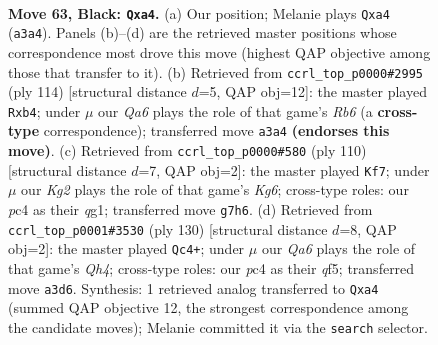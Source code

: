 \documentclass[11pt]{article}
\begin{document}
\clearpage

\begin{figure}[p]\centering
\begin{subfigure}{0.46\textwidth}\centering
\resizebox{\linewidth}{!}{%
\newchessgame
\chessboard[
  setfen={8/p5k1/1p6/8/P1P5/q7/4K3/8 b - - 0 63},
  showmover=false,
  pgfstyle=straightmove, color=movearrow, markmove={a3-a4}
]}
\caption{}
\end{subfigure}\hfill
\begin{subfigure}{0.46\textwidth}\centering
\resizebox{\linewidth}{!}{%
\newchessgame
\chessboard[
  setfen={8/6k1/1R6/8/1p1K4/1P6/P4p2/8 w - - 0 58},
  showmover=false,
  pgfstyle=straightmove, color=movearrow, markmove={b6-b4}
]}
\caption{}
\end{subfigure}
\\[4pt]
\begin{subfigure}{0.46\textwidth}\centering
\resizebox{\linewidth}{!}{%
\newchessgame
\chessboard[
  setfen={7Q/8/p5K1/8/1p3k2/1P6/P7/6q1 w - - 0 56},
  showmover=false,
  pgfstyle=straightmove, color=movearrow, markmove={g6-f7}
]}
\caption{}
\end{subfigure}\hfill
\begin{subfigure}{0.46\textwidth}\centering
\resizebox{\linewidth}{!}{%
\newchessgame
\chessboard[
  setfen={8/1p3k2/8/5q2/p6Q/P3K3/1P6/8 w - - 8 66},
  showmover=false,
  pgfstyle=straightmove, color=movearrow, markmove={h4-c4}
]}
\caption{}
\end{subfigure}
\caption{\textbf{Move 63, Black: \texttt{Qxa4}.} (a) Our position; Melanie plays \texttt{Qxa4} (\texttt{a3a4}). Panels (b)--(d) are the retrieved master positions whose correspondence most drove this move (highest QAP objective among those that transfer to it). (b) Retrieved from \texttt{ccrl\_top\_p0000\#2995} (ply 114) [structural distance $d$=5, QAP obj=12]: the master played \texttt{Rxb4}; under $\mu$ our \emph{Qa6} plays the role of that game's \emph{Rb6} (a \textbf{cross-type} correspondence); transferred move \texttt{a3a4} \textbf{(endorses this move)}. (c) Retrieved from \texttt{ccrl\_top\_p0000\#580} (ply 110) [structural distance $d$=7, QAP obj=2]: the master played \texttt{Kf7}; under $\mu$ our \emph{Kg2} plays the role of that game's \emph{Kg6}; cross-type roles: our \emph{p}c4 as their \emph{q}g1; transferred move \texttt{g7h6}. (d) Retrieved from \texttt{ccrl\_top\_p0001\#3530} (ply 130) [structural distance $d$=8, QAP obj=2]: the master played \texttt{Qc4+}; under $\mu$ our \emph{Qa6} plays the role of that game's \emph{Qh4}; cross-type roles: our \emph{p}c4 as their \emph{q}f5; transferred move \texttt{a3d6}. Synthesis: 1 retrieved analog transferred to \texttt{Qxa4} (summed QAP objective 12, the strongest correspondence among the candidate moves); Melanie committed it via the \texttt{search} selector.}
\label{fig:thought-m125}
\end{figure}
\end{document}
